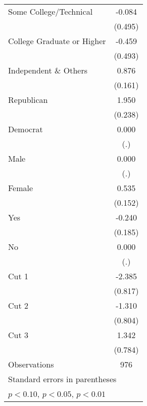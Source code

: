 \begin{table}[htbp]
\begin{tabular}{l*{1}{c}}
\addlinespace
Some College/Technical&      -0.084         \\
                    &     (0.495)         \\
\addlinespace
College Graduate or Higher&      -0.459         \\
                    &     (0.493)         \\
\addlinespace
Independent \& Others&       0.876\sym{***}\\
                    &     (0.161)         \\
\addlinespace
Republican          &       1.950\sym{***}\\
                    &     (0.238)         \\
\addlinespace
Democrat            &       0.000         \\
                    &         (.)         \\
\addlinespace
Male                &       0.000         \\
                    &         (.)         \\
\addlinespace
Female              &       0.535\sym{***}\\
                    &     (0.152)         \\
\addlinespace
Yes                 &      -0.240         \\
                    &     (0.185)         \\
\addlinespace
No                  &       0.000         \\
                    &         (.)         \\
\addlinespace
Cut 1               &      -2.385\sym{***}\\
                    &     (0.817)         \\
\addlinespace
Cut 2               &      -1.310         \\
                    &     (0.804)         \\
\addlinespace
Cut 3               &       1.342\sym{*}  \\
                    &     (0.784)         \\
\midrule
Observations        &         976         \\
\bottomrule
\multicolumn{2}{l}{\footnotesize Standard errors in parentheses}\\
\multicolumn{2}{l}{\footnotesize \sym{*} \(p<0.10\), \sym{**} \(p<0.05\), \sym{***} \(p<0.01\)}\\
\end{tabular}
\end{table}
